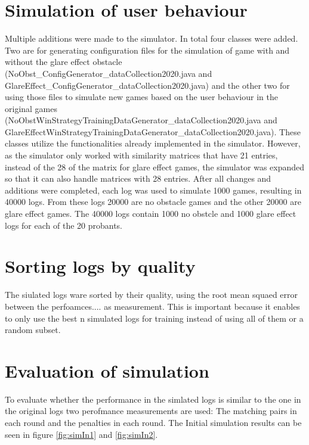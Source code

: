 \section{Simulation of user behaviour}
Multiple additions were made to the simulator. In total four classes were added. Two are for generating configuration files for the simulation of game with and without the glare effect obstacle (NoObst\_ConfigGenerator\_dataCollection2020.java and GlareEffect\_ConfigGenerator\_dataCollection2020.java) and the other two for using those files to simulate new games based on the user behaviour in the original games (NoObstWinStrategyTrainingDataGenerator\_dataCollection2020.java and GlareEffectWinStrategyTrainingDataGenerator\_dataCollection2020.java). These classes utilize the functionalities already implemented in the simulator.  However, as the simulator only worked with similarity matrices that have 21 entries, instead of the 28 of the matrix for glare effect games, the simulator was expanded so that it can also handle matrices with 28 entries. After all changes and additions were completed, each log was used to simulate 1000 games, resulting in 40000 logs. From these logs 20000 are no obstacle games and the other 20000 are glare effect games. The 40000 logs contain 1000 no obstcle and 1000 glare effect logs for each of the 20 probants.  


\section{Sorting logs by quality}
The siulated logs ware sorted by their quality, using the root mean squaed error between the perfoamces.... as measurement. This is important because it enables to only use the best n simulated logs for training instead of using all of them or a random subset. 

\section{Evaluation of simulation}
To evaluate whether the performance in the simlated logs is similar to the one in the original logs two perofmance measurements are used: The matching pairs in each round and the penalties in each round.  The Initial simulation results can be seen in figure \ref{fig:simIn1} and \ref{fig:simIn2}. 

